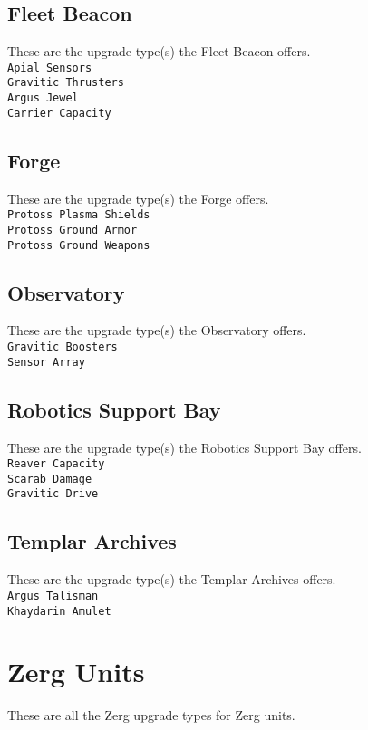 \subsection{Fleet Beacon}
These are the upgrade type(s) the Fleet Beacon offers. \\
\verb|Apial Sensors|\\
\verb|Gravitic Thrusters| \\
\verb|Argus Jewel|\\
\verb|Carrier Capacity|

\subsection{Forge}
These are the upgrade type(s) the Forge offers. \\
\verb|Protoss Plasma Shields|\\
\verb|Protoss Ground Armor|\\
\verb|Protoss Ground Weapons|\\

\subsection{Observatory}
These are the upgrade type(s) the Observatory offers. \\
\verb|Gravitic Boosters|\\
\verb|Sensor Array|

\subsection{Robotics Support Bay}
These are the upgrade type(s) the Robotics Support Bay offers. \\
\verb|Reaver Capacity|\\
\verb|Scarab Damage|\\
\verb|Gravitic Drive|

\subsection{Templar Archives}
These are the upgrade type(s) the Templar Archives offers. \\
\verb|Argus Talisman|\\
\verb|Khaydarin Amulet|

\section{Zerg Units}
These are all the Zerg upgrade types for Zerg units. \\

